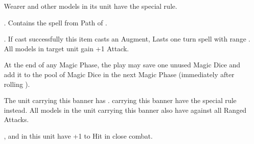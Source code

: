 \armyenchanteditems

\startpricelist

 Wearer and other \rnf{} models in its unit have the \distracting{} special rule.

\endpricelist

\armyarcaneitems

\startpricelist

 . Contains the spell \necromancyspelltwo{} from Path of \necromancy .

 . If cast successfully this item
casts an Augment, Lasts one turn spell with range . All \undead{} models in target unit gain +1 Attack.

 At the end of any Magic Phase, the play may save one unused Magic Dice and add it to the pool of Magic Dice in the next Magic Phase (immediately after rolling ).

\endpricelist

\armymagicalbanners

\startpricelist

 The unit carrying this banner has \bodyguard{\vampirelord , \vampirehero}. \vampireknights{} carrying this banner have the \stubborn{} special rule instead. All models in the unit carrying this banner also have  against all Ranged Attacks.

 \barrowknights , \barrowguards{} and \barrowkings{} in this unit have +1 to Hit in close combat.

\endpricelist

\closearmymagicalitems








\quickrefsheettitle


\bigskip
\noindent\begin{center}\Large{\textbf{}}\end{center}
\medskip

\newcommand{\QRSinvoctable}[2]{%
\rowcolors{1}{white}{black!10}
\noindent\begin{tabular}{p{2.7cm}>{\centering\let\newline\\\arraybackslash\hspace{0pt}}p{1cm}@{}}%
\antiquefont\Large{\textbf{#1\spacebeforecolon{}:}}&\vspace*{-0.2cm}%
\DTLforeach*[#2]{profiles}{\rowname=name, \rowtrooptype=trooptype, \rowcategory=category, \rowinvocation=invocation}{%
\tabularnewline\rowname{} & \rowinvocation{}}%
\tabularnewline%
\end{tabular}
\medskip
}

